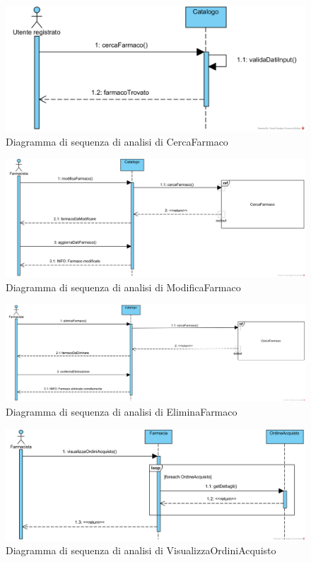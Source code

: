 \begin{figure}[!hbp]
	\centering
	\includegraphics[width=0.8\linewidth]{assets/sequence_analisi/SequenceAnalisiCercaFarmaco.png}
	\caption{Diagramma di sequenza di analisi di CercaFarmaco}
\end{figure}

\begin{figure}[!hbp]
	\centering
	\includegraphics[width=0.8\linewidth]{assets/sequence_analisi/SequenceAnalisiModificaFarmaco.png}
	\caption{Diagramma di sequenza di analisi di ModificaFarmaco}
\end{figure}

\begin{figure}[!hbp]
	\centering
	\includegraphics[width=0.8\linewidth]{assets/sequence_analisi/SequenceAnalisiEliminaFarmaco.png}
	\caption{Diagramma di sequenza di analisi di EliminaFarmaco}
\end{figure}

\begin{figure}[!hbp]
	\centering
	\includegraphics[width=0.8\linewidth]{assets/sequence_analisi/SequenceAnalisiVisualizzaOrdiniAcquisto.png}
	\caption{Diagramma di sequenza di analisi di VisualizzaOrdiniAcquisto}
\end{figure}

